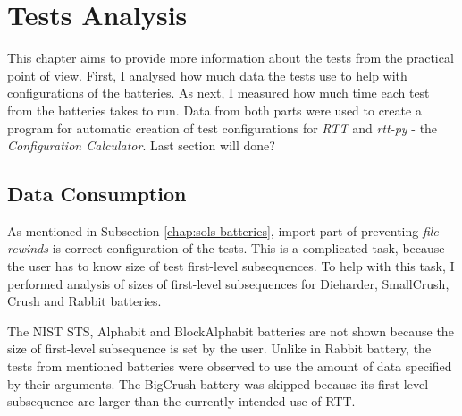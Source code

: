 \documentclass[
  digital,     %
  oneside,     %
  nosansbold,  %
  nocolorbold, %
  nolof,         %
  nolot,         %
]{fithesis4}
\begin{document}

\chapter{Tests Analysis} \label{chap: analysis}

This chapter aims to provide more information about the tests from the practical point of view. First, I analysed how much data the tests use to help with configurations of the batteries. As next, I measured how much time each test from the batteries takes to run. Data from both parts were used to create a program for automatic creation of test configurations for \emph{RTT} and \emph{rtt-py} - the \emph{Configuration Calculator}. Last section will done? %




\section{Data Consumption} \label{chap:analysis-data}


As mentioned in Subsection \ref{chap:sols-batteries}, import part of preventing \emph{file rewinds} is correct configuration of the tests. This is a complicated task, because the user has to know size of test first-level subsequences. To help with this task, I performed analysis of sizes of first-level subsequences for Dieharder, SmallCrush, Crush and Rabbit batteries.  %

The NIST STS, Alphabit and BlockAlphabit batteries are not shown because the size of first-level subsequence is set by the user. Unlike in Rabbit battery, the tests from mentioned batteries were observed to use the amount of data specified by their arguments. The BigCrush battery was skipped because its first-level subsequence are larger than the currently intended use of RTT.
\end{document}
